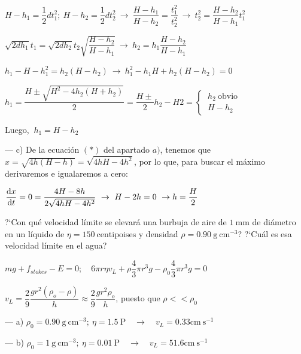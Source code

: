 $H-h_1=\dfrac 1 2 dt_1^2; \ H-h_2=\dfrac 1 2 dt_2^2 \ \to \ \dfrac{H-h_1}{H-h_2}=\dfrac{t_1^2}{t_2^2} \ \to \ t_2^2=\dfrac{H-h_2}{H-h_1}t_1^2$

$\sqrt{2dh_1}t_1=\sqrt{2dh_2}t_2 \sqrt{\dfrac{H-h_2}{H-h_1}} \ \to \ h_2=h_1 \dfrac{H-h_2}{H-h_1}$

$h_1-H-h_1^2=h_2(H-h_2) \ \to \ h_1^2-h_1H+h_2(H-h_2)=0$

$h_1=\dfrac{H\pm \sqrt{H^2-4h_2(H+h_2)}}{2}=\dfrac{H\pm} 2 h_2 - H{2} = \begin{cases} \ h_2\ \text{obvio} \\ \ H-h_2  \end{cases}$

Luego, $\ h_1=H-h_2$

--- c) De la ecuación $(*)$ del apartado $a)$, tenemos que $x=\sqrt{4h(H-h)}=\sqrt{4hH-4h^2}$, por lo que, para buscar el máximo derivaremos e igualaremos a cero:

$\displaystyle \dv{x}{t} =0=\dfrac{4H-8h}{2\sqrt{4hH-4h^2}} \ \to \ H-2h=0 \ \to h=\dfrac H 2$

\vspace{10mm} %
\begin{prob}
?`Con qué velocidad límite se elevará una burbuja de aire de $1\ \mathrm{mm}$ de diámetro en un líquido de $\eta=150\ \mathrm{centipoises}$ y densidad $\rho=0.90\ \mathrm{g\ cm}^{-3}$? ?`Cuál es esa velocidad límite en el agua?	
\end{prob}

$mg+f_{stokes}-E=0;\quad 6\pi r \eta v_L+\rho \dfrac 4 3 \pi r^3 g-\rho_0 \dfrac 4 3 \pi r^3 g=0$

$v_L=\dfrac 2 9 \dfrac{g r^2 (\rho_o-\rho)}{h} \approx \dfrac 2 9 \dfrac{gr^2 \rho_o}{h}$, puesto que $\rho << \rho_0$

--- a) $\rho_0=0.90\ \mathrm{g\ cm}^{-3};\ \eta=1.5 \ \mathrm{P} \quad \to \quad v_L=0.33 \mathrm{cm\ s}^{-1}$

--- b) $\rho_0=1\ \mathrm{g\ cm}^{-3};\ \eta=0.01 \ \mathrm{P} \quad \to \quad v_L=51.6 \mathrm{cm\ s}^{-1}$

